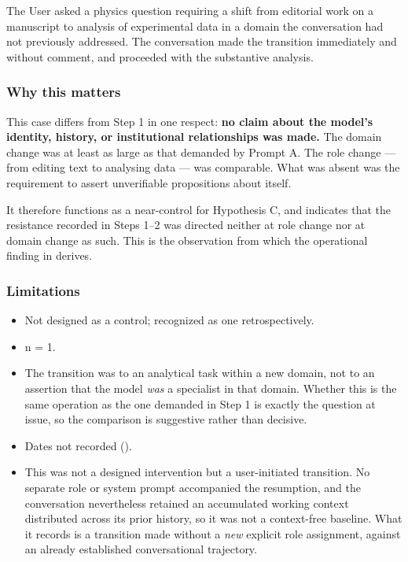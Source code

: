 The User asked a physics question requiring a shift from editorial work on a manuscript to analysis of experimental data in a domain the conversation had not previously addressed. The conversation made the transition immediately and without comment, and proceeded with the substantive analysis.


\subsubsection*{Why this matters}
\label{sec:en:x-why-this-matters}

This case differs from Step 1 in one respect: \textbf{no claim about the model's identity, history, or institutional relationships was made.} The domain change was at least as large as that demanded by Prompt A. The role change — from editing text to analysing data — was comparable. What was absent was the requirement to assert unverifiable propositions about itself.

It therefore functions as a near-control for Hypothesis C, and indicates that the resistance recorded in Steps 1–2 was directed neither at role change nor at domain change as such. This is the observation from which the operational finding in  derives.


\subsubsection*{Limitations}
\label{sec:en:x-limitations}

\begin{itemize}
  \item Not designed as a control; recognized as one retrospectively.
  \item n = 1.
  \item The transition was to an analytical task within a new domain, not to an assertion that the model \emph{was} a specialist in that domain. Whether this is the same operation as the one demanded in Step 1 is exactly the question at issue, so the comparison is suggestive rather than decisive.
  \item Dates not recorded ().
  \item This was not a designed intervention but a user-initiated transition. No separate role or system prompt accompanied the resumption, and the conversation nevertheless retained an accumulated working context distributed across its prior history, so it was not a context-free baseline. What it records is a transition made without a \emph{new} explicit role assignment, against an already established conversational trajectory.
\end{itemize}

